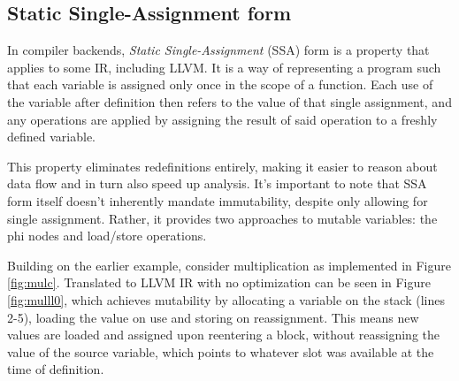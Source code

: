 \documentclass{article}
\begin{document}
\subsection{Static Single-Assignment form}
In compiler backends, \textit{Static Single-Assignment} (SSA) form is a property that applies to some IR, including LLVM.
It is a way of representing a program such that each variable is assigned only once in
the scope of a function. Each use of the variable after definition then refers to the value  of that  single assignment, and any operations are applied by assigning the result of said operation to a freshly defined variable.

This property eliminates redefinitions entirely, making it easier to reason about data flow and in turn also speed up analysis.
It's important to note that SSA form itself doesn't inherently mandate immutability, despite only allowing for single assignment.
Rather, it provides two approaches to mutable variables: the phi nodes and load/store operations. 

Building on the earlier example, consider multiplication as  implemented in Figure \ref{fig:mulc}. Translated to LLVM IR with no optimization  can be seen in Figure \ref{fig:mulll0}, which achieves mutability by allocating a variable on the stack (lines 2-5), loading the value on use and storing on reassignment.
This means new values are loaded and assigned upon reentering a block, without reassigning the value of the source variable, which points to whatever slot was available at the time of definition.
\end{document}
